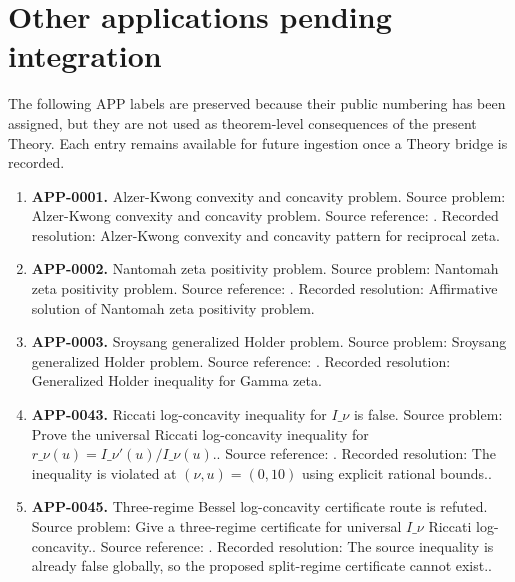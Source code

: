 \section{Other applications pending integration}
The following APP labels are preserved because their public numbering has been assigned, but they are not used as theorem-level consequences of the present Theory.  Each entry remains available for future ingestion once a Theory bridge is recorded.
\begin{enumerate}[leftmargin=*]
\item \label{app:app-0001}\textbf{APP-0001.} Alzer-Kwong convexity and concavity problem.  Source problem: Alzer-Kwong convexity and concavity problem. Source reference: \cite{app-app-0001-source}.  Recorded resolution: Alzer-Kwong convexity and concavity pattern for reciprocal zeta.
\item \label{app:app-0002}\textbf{APP-0002.} Nantomah zeta positivity problem.  Source problem: Nantomah zeta positivity problem. Source reference: \cite{nantomah}.  Recorded resolution: Affirmative solution of Nantomah zeta positivity problem.
\item \label{app:app-0003}\textbf{APP-0003.} Sroysang generalized Holder problem.  Source problem: Sroysang generalized Holder problem. Source reference: \cite{sroysang}.  Recorded resolution: Generalized Holder inequality for Gamma zeta.
\item \label{app:app-0043}\textbf{APP-0043.} Riccati log-concavity inequality for \(I\_\nu\) is false.  Source problem: Prove the universal Riccati log-concavity inequality for \(r\_\nu(u)=I\_\nu'(u)/I\_\nu(u)\).. Source reference: \cite{app-app-0042-source}.  Recorded resolution: The inequality is violated at \((\nu,u)=(0,10)\) using explicit rational bounds..
\item \label{app:app-0045}\textbf{APP-0045.} Three-regime Bessel log-concavity certificate route is refuted.  Source problem: Give a three-regime certificate for universal \(I\_\nu\) Riccati log-concavity.. Source reference: \cite{app-app-0042-source}.  Recorded resolution: The source inequality is already false globally, so the proposed split-regime certificate cannot exist..
\end{enumerate}
